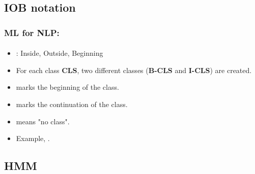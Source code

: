 \documentclass[xcolor=table]{beamer}
\begin{document}
	\subsection{IOB notation}
	
	\begin{frame}
		\frametitle{ML for NLP: \insertsection}
		\framesubtitle{\insertsubsection}
		
		\begin{itemize}
			\item {}: Inside, Outside, Beginning
			\item For each class \textbf{CLS}, two different classes (\textbf{B-CLS} and \textbf{I-CLS}) are created.
			\item {} marks the beginning of the class.
			\item {} marks the continuation of the class.
			\item {} means "no class".
			\item Example, .
		\end{itemize}
	\end{frame}
	
	\subsection{HMM}
	
\end{document}
